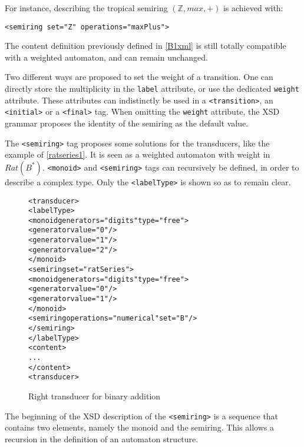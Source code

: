\documentclass[a4paper]{article}
\newcommand{\xtag}[1]{\texttt{<#1>}}
\newcommand{\xattr}[1]{\texttt{#1}}
\def\typetag{\xtag{labelType}}
\def\dstname{\xattr{dst}}
\def\srcname{\xattr{src}}
\def\transitiontag{\xtag{transition}}
\def\finaltag{\xtag{final}}
\def\initialtag{\xtag{initial}}
\def\monoidtag{\xtag{monoid}}
\def\semiringtag{\xtag{semiring}}
\begin{document}
For instance, describing the tropical semiring $({\mathbb Z}, max, +)$
is achieved with:
\begin{center}
{\small
\verb|<semiring set="Z" operations="maxPlus">|}
\end{center}

The content definition previously defined in \autoref{B1xml} is
still totally compatible with a weighted automaton, and can remain
unchanged.

Two different ways are proposed to set the weight of a transition. One
can directly store the multiplicity in the \verb|label| attribute, or
use the dedicated \verb|weight| attribute. These attributes can
indistinctly be used in a \transitiontag{}, an \initialtag{} or a
\finaltag{} tag. When omitting the \verb|weight| attribute, the XSD
grammar proposes the identity of the semiring as the default value.

\medskip

The \semiringtag{} tag proposes some solutions for the transducers,
like the example of \autoref{ratseries1}. It is seen as a weighted automaton
with weight in $Rat(B^*)$. \monoidtag{} and \semiringtag{} tags can
recursively be defined, in order to describe a complex type. Only the
\typetag{} is shown so as to remain clear.

\begin{figure}[ht]
  \begin{center}
\begin{alltt}
<transducer>
  <labelType>
    <monoid generators="digits" type="free">
      <generator value="0"/>
      <generator value="1"/>
      <generator value="2"/>
    </monoid>
    <semiring set="ratSeries">
      <monoid generators="digits" type="free">
        <generator value="0"/>
        <generator value="1"/>
      </monoid>
      <semiring operations="numerical" set="B"/>
    </semiring>
  </labelType>
  <content>
    ...
  </content>
<transducer>
\end{alltt}
\caption{Right transducer for binary addition}
\label{ratseries1}
  \end{center}
\end{figure}

The beginning of the XSD description of the \semiringtag{} is a sequence that
contains two elements, namely the monoid and the semiring. This allows a
recursion in the definition of an automaton structure.

\end{document}
